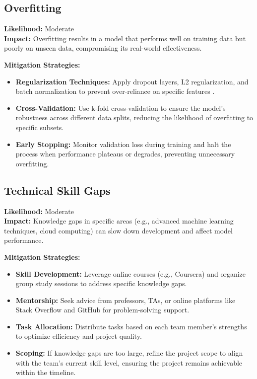 \documentclass{article} %
\begin{document}
\subsection{Overfitting}
\textbf{Likelihood:} Moderate \\
\textbf{Impact:} Overfitting results in a model that performs well on training data but poorly on unseen data, compromising its real-world effectiveness.

\textbf{Mitigation Strategies:}
\begin{itemize}
    \item \textbf{Regularization Techniques:} Apply dropout layers, L2 regularization, and batch normalization to prevent over-reliance on specific features \cite{srivastava2014}.
    \item \textbf{Cross-Validation:} Use k-fold cross-validation to ensure the model’s robustness across different data splits, reducing the likelihood of overfitting to specific subsets.
    \item \textbf{Early Stopping:} Monitor validation loss during training and halt the process when performance plateaus or degrades, preventing unnecessary overfitting.
\end{itemize}

\subsection{Technical Skill Gaps}
\textbf{Likelihood:} Moderate \\
\textbf{Impact:} Knowledge gaps in specific areas (e.g., advanced machine learning techniques, cloud computing) can slow down development and affect model performance.

\textbf{Mitigation Strategies:}
\begin{itemize}
    \item \textbf{Skill Development:} Leverage online courses (e.g., Coursera) and organize group study sessions to address specific knowledge gaps.
    \item \textbf{Mentorship:} Seek advice from professors, TAs, or online platforms like Stack Overflow and GitHub for problem-solving support.
    \item \textbf{Task Allocation:} Distribute tasks based on each team member’s strengths to optimize efficiency and project quality.
    \item \textbf{Scoping:} If knowledge gaps are too large, refine the project scope to align with the team’s current skill level, ensuring the project remains achievable within the timeline.
\end{itemize}
\end{document}
